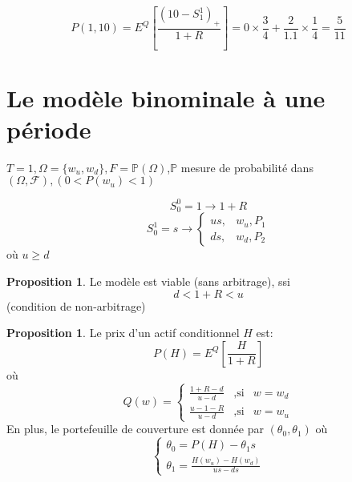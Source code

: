 \documentclass{article}
\theoremstyle{plain}
\theoremstyle{definition}
\newtheorem{propos}[thm]{Proposition}
\begin{document}
\begin{equation}
P(1,10) = E^Q[\frac{(10-S_1^1)_+}{1+R}]=0\times\frac{3}{4}+\frac{2}{1.1}\times\frac{1}{4}=\frac{5}{11}
\end{equation}

\section{Le mod\`ele binominale \`a une p\'eriode}

$T=1,\Omega=\{w_u,w_d\},F=\mathbb{P}(\Omega)$,$\mathbb{P}$ mesure de probabilit\'e dans $(\Omega,\mathcal{F}),(0<P(w_u)<1)$

\begin{equation}
S_0^0=1\rightarrow 1+R
\end{equation}
\begin{equation}
S_0^1=s\rightarrow
\left\{\begin{array}{rc}
	us, &w_u,P_1\\
	ds, &w_d, P_2
\end{array}\right.
\end{equation}
o\`u $u \geq d$

\begin{propos}
	Le mod\`ele est viable (sans arbitrage), ssi
	\begin{equation}
	d<1+R<u
	\end{equation}
	(condition de non-arbitrage)
\end{propos}

\begin{propos}
	Le prix d'un actif conditionnel $H$ est:
	\begin{equation}
P(H)=E^Q[\frac{H}{1+R}]
\end{equation} 
o\`u
\begin{equation}
Q(w) = \left\{\begin{array}{rcl}
	\frac{1+R-d}{u-d} & ,\text{si} &w=w_d\\
	\frac{u-1-R}{u-d} & ,\text{si} &w=w_u
\end{array} \right.
\end{equation}
En plus, le portefeuille de couverture est donn\'ee par $(\theta_0,\theta_1)$ o\`u 
\begin{equation}
	\left\{\begin{array}{rc}
		\theta_0=P(H)-\theta_1 s\\
		\theta_1=\frac{H(w_u)-H(w_d)}{us-ds}
	\end{array}\right.
\end{equation}
\end{propos}
\end{document}
